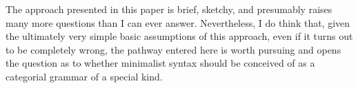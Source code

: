 \documentclass[output=paper
,modfonts
,nonflat]{langsci/langscibook}
\begin{document}
The approach presented in this paper is brief, sketchy, and presumably raises many more questions than I can ever answer. Nevertheless, I do think that, given the ultimately very simple basic assumptions of this approach, even if it turns out to be completely wrong, the pathway entered here is worth pursuing and opens the question as to whether minimalist syntax should be conceived of as a categorial grammar of a special kind. 

{\sloppy\printbibliography[heading=subbibliography,notkeyword=this]}
\end{document}
